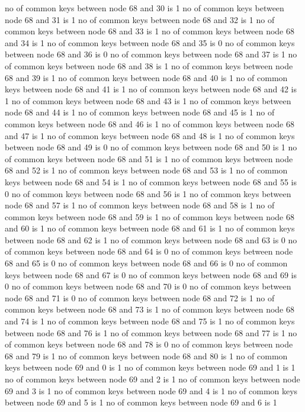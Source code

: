 no of common keys between node 68 and 30 is 1
no of common keys between node 68 and 31 is 1
no of common keys between node 68 and 32 is 1
no of common keys between node 68 and 33 is 1
no of common keys between node 68 and 34 is 1
no of common keys between node 68 and 35 is 0
no of common keys between node 68 and 36 is 0
no of common keys between node 68 and 37 is 1
no of common keys between node 68 and 38 is 1
no of common keys between node 68 and 39 is 1
no of common keys between node 68 and 40 is 1
no of common keys between node 68 and 41 is 1
no of common keys between node 68 and 42 is 1
no of common keys between node 68 and 43 is 1
no of common keys between node 68 and 44 is 1
no of common keys between node 68 and 45 is 1
no of common keys between node 68 and 46 is 1
no of common keys between node 68 and 47 is 1
no of common keys between node 68 and 48 is 1
no of common keys between node 68 and 49 is 0
no of common keys between node 68 and 50 is 1
no of common keys between node 68 and 51 is 1
no of common keys between node 68 and 52 is 1
no of common keys between node 68 and 53 is 1
no of common keys between node 68 and 54 is 1
no of common keys between node 68 and 55 is 0
no of common keys between node 68 and 56 is 1
no of common keys between node 68 and 57 is 1
no of common keys between node 68 and 58 is 1
no of common keys between node 68 and 59 is 1
no of common keys between node 68 and 60 is 1
no of common keys between node 68 and 61 is 1
no of common keys between node 68 and 62 is 1
no of common keys between node 68 and 63 is 0
no of common keys between node 68 and 64 is 0
no of common keys between node 68 and 65 is 0
no of common keys between node 68 and 66 is 0
no of common keys between node 68 and 67 is 0
no of common keys between node 68 and 69 is 0
no of common keys between node 68 and 70 is 0
no of common keys between node 68 and 71 is 0
no of common keys between node 68 and 72 is 1
no of common keys between node 68 and 73 is 1
no of common keys between node 68 and 74 is 1
no of common keys between node 68 and 75 is 1
no of common keys between node 68 and 76 is 1
no of common keys between node 68 and 77 is 1
no of common keys between node 68 and 78 is 0
no of common keys between node 68 and 79 is 1
no of common keys between node 68 and 80 is 1
no of common keys between node 69 and 0 is 1
no of common keys between node 69 and 1 is 1
no of common keys between node 69 and 2 is 1
no of common keys between node 69 and 3 is 1
no of common keys between node 69 and 4 is 1
no of common keys between node 69 and 5 is 1
no of common keys between node 69 and 6 is 1
